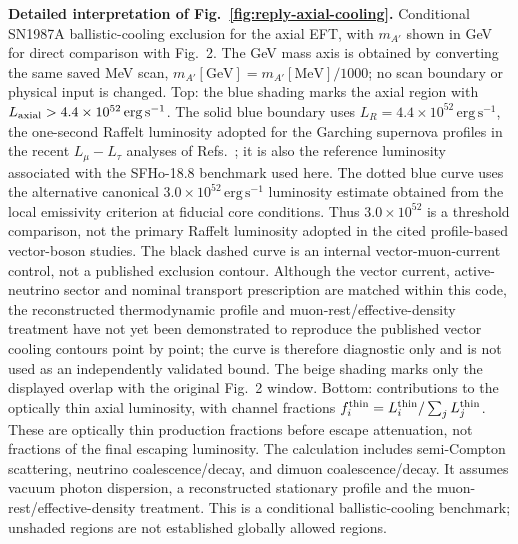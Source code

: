 \documentclass[12pt,a4paper]{article}
\begin{document}
\noindent\textbf{Detailed interpretation of Fig.~\ref{fig:reply-axial-cooling}.} Conditional SN1987A ballistic-cooling exclusion for the axial EFT, with \(m_{A'}\) shown in GeV for direct comparison with Fig.~2. The GeV mass axis is obtained by converting the same saved MeV scan, \(m_{A'}[\mathrm{GeV}]=m_{A'}[\mathrm{MeV}]/1000\); no scan boundary or physical input is changed. Top: the blue shading marks the axial region with \(L_{\rm axial}>4.4\times10^{52}\,\mathrm{erg\,s^{-1}}\). The solid blue boundary uses \(L_R=4.4\times10^{52}\,\mathrm{erg\,s^{-1}}\), the one-second Raffelt luminosity adopted for the Garching supernova profiles in the recent \(L_\mu-L_\tau\) analyses of Refs.~\cite{Blinov:2025aha,Wang:2026supernova}; it is also the reference luminosity associated with the SFHo-18.8 benchmark used here. The dotted blue curve uses the alternative canonical \(3.0\times10^{52}\,\mathrm{erg\,s^{-1}}\) luminosity estimate obtained from the local emissivity criterion at fiducial core conditions. Thus \(3.0\times10^{52}\) is a threshold comparison, not the primary Raffelt luminosity adopted in the cited profile-based vector-boson studies. The black dashed curve is an internal vector-muon-current control, not a published exclusion contour. Although the vector current, active-neutrino sector and nominal transport prescription are matched within this code, the reconstructed thermodynamic profile and muon-rest/effective-density treatment have not yet been demonstrated to reproduce the published vector cooling contours point by point; the curve is therefore diagnostic only and is not used as an independently validated bound. The beige shading marks only the displayed overlap with the original Fig.~2 window. Bottom: contributions to the optically thin axial luminosity, with channel fractions \(f_i^{\rm thin}=L_i^{\rm thin}/\sum_j L_j^{\rm thin}\). These are optically thin production fractions before escape attenuation, not fractions of the final escaping luminosity. The calculation includes semi-Compton scattering, neutrino coalescence/decay, and dimuon coalescence/decay. It assumes vacuum photon dispersion, a reconstructed stationary profile and the muon-rest/effective-density treatment. This is a conditional ballistic-cooling benchmark; unshaded regions are not established globally allowed regions.
\end{document}
